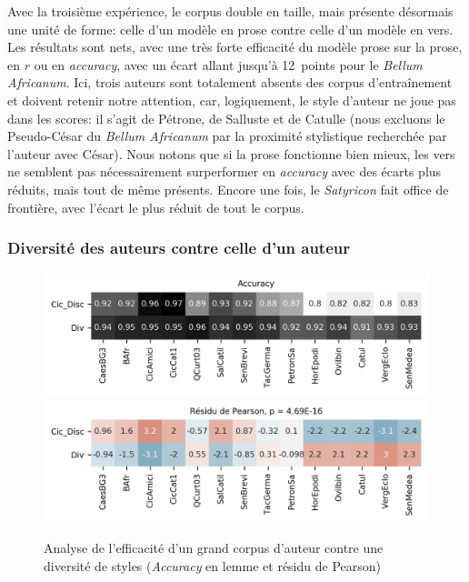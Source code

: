 Avec la troisième expérience, le corpus double en taille, mais présente désormais une unité de forme: celle d'un modèle en prose contre celle d'un modèle en vers. Les résultats sont nets, avec une très forte efficacité du modèle prose sur la prose, en $r$ ou en \textit{accuracy}, avec un écart allant jusqu'à 12~points pour le \textit{Bellum Africanum}. Ici, trois auteurs sont totalement absents  des corpus d'entraînement et doivent retenir notre attention, car, logiquement, le style d'auteur ne joue pas dans les scores: il s'agit de Pétrone, de Salluste et de Catulle (nous excluons le Pseudo-César du \textit{Bellum Africanum} par la proximité stylistique recherchée par l'auteur avec César). Nous notons que si la prose fonctionne bien mieux, les vers ne semblent pas nécessairement surperformer en \textit{accuracy} avec des écarts plus réduits, mais tout de même présents. Encore une fois, le \textit{Satyricon} fait office de frontière, avec l'écart le plus réduit de tout le corpus.

\subsubsection{Diversité des auteurs contre celle d'un auteur}

\begin{figure}[ht]
    \centering
    \includegraphics[width=0.7\linewidth]{figures/chap3/longreeVariante/LongreeVariante-AccuracyDiversiteDAuteursContreDiversiteDAuteur-Lemme.png}
    \includegraphics[width=0.7\linewidth]{figures/chap3/longreeVariante/LongreeVariante-AssocPlotDiversiteDAuteursContreDiversiteDAuteur-Lemme.png}
    \caption{Analyse de l'efficacité d'un grand corpus d'auteur contre une diversité de styles (\textit{Accuracy} en lemme et résidu de Pearson)}
    \label{fig:lemmatisation:longree:divAuteursVSTailleAuteur}
\end{figure}

